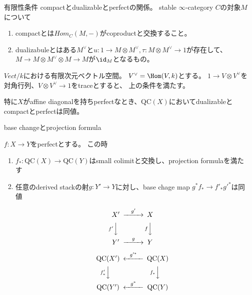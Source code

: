 \documentclass[dvipdfmx]{beamer}
\newcommand{\QC}{\mathrm{QC}}
\begin{document}
\begin{frame}{有限性条件}
compactとdualizableとperfectの関係。
stable $\infty$-category $C$の対象$M$について

\begin{enumerate}
\item compactとは$Hom_C(M,-)$がcoproductと交換すること。
\item dualizabuleとはある$M^\vee$と$u:1\to M\otimes M^\vee, \tau:M\otimes M^\vee \to 1$が存在して、
$M \to M \otimes M^\vee \otimes M \to M$が$\id_M$となるもの。
\end{enumerate}

$Vect/k$における有限次元ベクトル空間。
$V^\vee = \Hom(V,k)$とする。
$1\to V\otimes V^\vee$を対角行列、$V\otimes V^\vee \to 1$をtraceとすると、
上の条件を満たす。

特に$X$がaffine diagonalを持ちperfectなとき、$\QC(X)$においてdualizableとcompactとperfectは同値。
\end{frame}

\begin{frame}{base changeとprojection formula}

\begin{prop}
$f:X \to Y$をperfectとする。
この時
\begin{enumerate}
\item $f_*:\QC(X) \to \QC(Y)$はsmall colimitと交換し、projection formulaを満たす
\item 任意のderived stackの射$g:Y' \to Y$に対し、base chage map $g^*f_* \to f'_*g'^*$は同値
\begin{multicols}{2}
\[
\begin{CD}
X'@>g'>>X\\
@Vf'VV@VfVV\\
Y'@>g>>Y
\end{CD}
\]

\[
\begin{CD}
\QC(X')@<g'^*<<\QC(X)\\
@Vf'_*VV@Vf_*VV\\
\QC(Y')@<g^*<<\QC(Y)
\end{CD}
\]
\end{multicols}
\end{enumerate}
\end{prop}
\end{frame}
\end{document}
